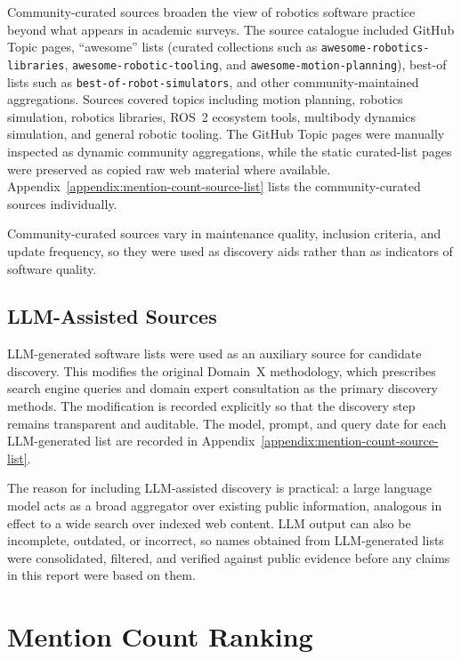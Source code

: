 Community-curated sources broaden the view of robotics software practice beyond what appears in academic surveys. The source catalogue included GitHub Topic pages, ``awesome'' lists (curated collections such as \texttt{awesome-robotics-libraries}, \texttt{awesome-robotic-tooling}, and \texttt{awesome-motion-planning}), best-of lists such as \texttt{best-of-robot-simulators}, and other community-maintained aggregations. Sources covered topics including motion planning, robotics simulation, robotics libraries, ROS~2 ecosystem tools, multibody dynamics simulation, and general robotic tooling. The GitHub Topic pages were manually inspected as dynamic community aggregations, while the static curated-list pages were preserved as copied raw web material where available. Appendix~\ref{appendix:mention-count-source-list} lists the community-curated sources individually.

Community-curated sources vary in maintenance quality, inclusion criteria, and update frequency, so they were used as discovery aids rather than as indicators of software quality.

\subsection{LLM-Assisted Sources}
\label{subsec:llm-assisted-sources}

LLM-generated software lists were used as an auxiliary source for candidate discovery. This modifies the original Domain~X methodology, which prescribes search engine queries and domain expert consultation as the primary discovery methods. The modification is recorded explicitly so that the discovery step remains transparent and auditable. The model, prompt, and query date for each LLM-generated list are recorded in Appendix~\ref{appendix:mention-count-source-list}.

The reason for including LLM-assisted discovery is practical: a large language model acts as a broad aggregator over existing public information, analogous in effect to a wide search over indexed web content. LLM output can also be incomplete, outdated, or incorrect, so names obtained from LLM-generated lists were consolidated, filtered, and verified against public evidence before any claims in this report were based on them.

\section{Mention Count Ranking}
\label{sec:mention-count-ranking}

